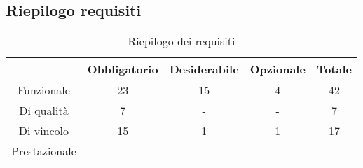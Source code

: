 \subsection{Riepilogo requisiti} \label{subsection: riepilogo}

\begin{table}[H]
	\centering
	\renewcommand{\arraystretch}{1.8}
	\begin{tabular}{c | c | c | c | c}
		\rowcolor[HTML]{125E28}
		\multicolumn{1}{c}{\color[HTML]{FFFFFF} \textbf{Tipologia}}    &
		\multicolumn{1}{c}{\color[HTML]{FFFFFF} \textbf{Obbligatorio}} &
		\multicolumn{1}{c}{\color[HTML]{FFFFFF} \textbf{Desiderabile}} &
		\multicolumn{1}{c}{\color[HTML]{FFFFFF} \textbf{Opzionale}}    &
		\multicolumn{1}{c}{\color[HTML]{FFFFFF} \textbf{Totale}}                          \\
		\hline
		Funzionale                                                     & 23 & 15 & 4 & 42 \\ \hline
		Di qualità                                                     & 7  & -  & - & 7  \\ \hline
		Di vincolo                                                     & 15 & 1  & 1 & 17 \\ \hline
		Prestazionale                                                  & -  & -  & - & -  \\
	\end{tabular}
	\caption{Riepilogo dei requisiti}
\end{table}